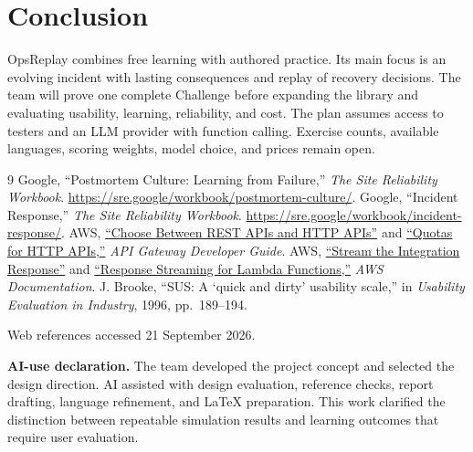 \documentclass[11pt,a4paper]{article}
\begin{document}
\section{Conclusion}
OpsReplay combines free learning with authored practice. Its main focus is an
evolving incident with lasting consequences and replay of recovery decisions.
The team will prove one complete Challenge before expanding the library and
evaluating usability, learning, reliability, and cost. The plan assumes access
to testers and an LLM provider with function calling. Exercise counts, available
languages, scoring weights, model choice, and prices remain open.

\begingroup
\small
\begin{thebibliography}{9}
\setlength{\itemsep}{2pt}
Google, ``Postmortem Culture: Learning from Failure,''
\textit{The Site Reliability Workbook}.\newline
\url{https://sre.google/workbook/postmortem-culture/}.
Google, ``Incident Response,'' \textit{The Site Reliability Workbook}.\newline
\url{https://sre.google/workbook/incident-response/}.
AWS, \href{https://docs.aws.amazon.com/apigateway/latest/developerguide/http-api-vs-rest.html}{``Choose Between REST APIs and HTTP APIs''} and
\href{https://docs.aws.amazon.com/apigateway/latest/developerguide/http-api-quotas.html}{``Quotas for HTTP APIs,''}
\textit{API Gateway Developer Guide}.
AWS, \href{https://docs.aws.amazon.com/apigateway/latest/developerguide/response-transfer-mode.html}{``Stream the Integration Response''} and
\href{https://docs.aws.amazon.com/lambda/latest/dg/configuration-response-streaming.html}{``Response Streaming for Lambda Functions,''}
\textit{AWS Documentation}.
J. Brooke, ``SUS: A `quick and dirty' usability scale,''
in \textit{Usability Evaluation in Industry}, 1996, pp.~189--194.
\end{thebibliography}
Web references accessed 21 September 2026.

\medskip
\textbf{AI-use declaration.}
The team developed the project concept and selected the design direction. AI
assisted with design evaluation, reference checks, report drafting, language
refinement, and LaTeX preparation. This work clarified the distinction between
repeatable simulation results and learning outcomes that require user evaluation.
\endgroup
\end{document}
